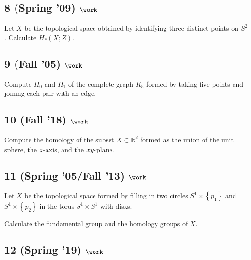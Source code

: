 \hypertarget{spring-09-work-4}{%
\subsection{\texorpdfstring{8 (Spring '09)
\(\work\)}{8 (Spring '09) \textbackslash work}}\label{spring-09-work-4}}

Let \(X\) be the topological space obtained by identifying three
distinct points on \(S^2\). Calculate \(H_* (X; Z)\).

\hypertarget{fall-05-work}{%
\subsection{\texorpdfstring{9 (Fall '05)
\(\work\)}{9 (Fall '05) \textbackslash work}}\label{fall-05-work}}

Compute \(H_0\) and \(H_1\) of the complete graph \(K_5\) formed by
taking five points and joining each pair with an edge.

\hypertarget{fall-18-work-4}{%
\subsection{\texorpdfstring{10 (Fall '18)
\(\work\)}{10 (Fall '18) \textbackslash work}}\label{fall-18-work-4}}

Compute the homology of the subset \(X \subset {\mathbb{R}}^3\) formed
as the union of the unit sphere, the \(z{\hbox{-}}\)axis, and the
\(xy{\hbox{-}}\)plane.

\hypertarget{spring-05fall-13-work}{%
\subsection{\texorpdfstring{11 (Spring '05/Fall '13)
\(\work\)}{11 (Spring '05/Fall '13) \textbackslash work}}\label{spring-05fall-13-work}}

Let \(X\) be the topological space formed by filling in two circles
\(S^1 \times \left\{{p_1 }\right\}\) and
\(S^1 \times \left\{{p_2 }\right\}\) in the torus \(S^1 \times S^1\)
with disks.

Calculate the fundamental group and the homology groups of \(X\).

\hypertarget{spring-19-work-1}{%
\subsection{\texorpdfstring{12 (Spring '19)
\(\work\)}{12 (Spring '19) \textbackslash work}}\label{spring-19-work-1}}

